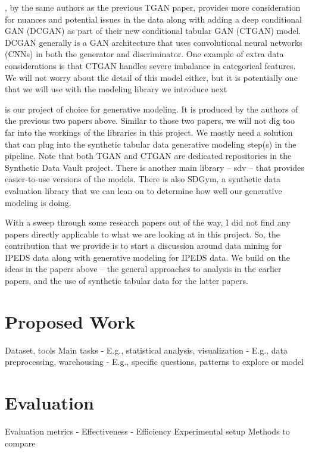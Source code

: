 \documentclass[sigconf, authorversion, nonacm]{acmart}
\begin{document}
    \cite{DBLP:journals/corr/abs-1907-00503}, by the same authors as the previous TGAN paper, provides more consideration for nuances and potential issues in the data along with adding a deep conditional GAN (DCGAN) as part of their new conditional tabular GAN (CTGAN) model. DCGAN generally is a GAN architecture that uses convolutional neural networks (CNNs) in both the generator and discriminator. One example of extra data considerations is that CTGAN handles severe imbalance in categorical features. We will not worry about the detail of this model either, but it is potentially one that we will use with the modeling library we introduce next

    \cite{sdv} is our project of choice for generative modeling. It is produced by the authors of the previous two papers above. Similar to those two papers, we will not dig too far into the workings of the libraries in this project. We mostly need a solution that can plug into the synthetic tabular data generative modeling step(s) in the pipeline. Note that both TGAN and CTGAN are dedicated repositories in the Synthetic Data Vault project. There is another main library -- sdv -- that provides easier-to-use versions of the models. There is also SDGym, a synthetic data evaluation library that we can lean on to determine how well our generative modeling is doing.

    With a sweep through some research papers out of the way, I did not find any papers directly applicable to what we are looking at in this project. So, the contribution that we provide is to start a discussion around data mining for IPEDS data along with generative modeling for IPEDS data. We build on the ideas in the papers above -- the general approaches to analysis in the earlier papers, and the use of synthetic tabular data for the latter papers.

\section{Proposed Work}
Dataset, tools
Main tasks
    - E.g., statistical analysis, visualization
    - E.g., data preprocessing, warehousing
    - E.g., specific questions, patterns to explore or model

\section{Evaluation}
Evaluation metrics
    - Effectiveness
    - Efficiency
Experimental setup
Methods to compare
\end{document}
